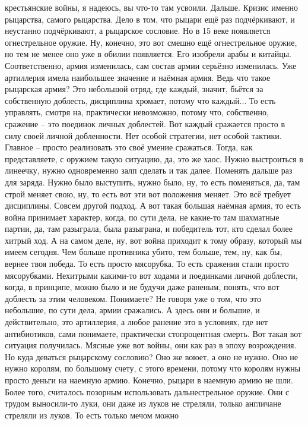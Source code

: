 крестьянские войны, я надеюсь, вы что-то там усвоили. Дальше. Кризис именно
рыцарства, самого рыцарства. Дело в том, что рыцари ещё раз подчёркивают, и
неустанно подчёркивают, а рыцарское сословие. Но в 15 веке появляется
огнестрельное оружие. Ну, конечно, это вот смешно ещё огнестрельное оружие, но
тем не менее оно уже в обилии появляется. Его изобрели арабы и китайцы.
Соответственно, армия изменилась, сам состав армии серьёзно изменилась. Уже
артиллерия имела наибольшее значение и наёмная армия. Ведь что такое рыцарская
армия? Это небольшой отряд, где каждый, значит, бьётся за собственную доблесть,
дисциплина хромает, потому что каждый... То есть управлять, смотря на,
практически невозможно, потому что, собственно, сражение – это поединок личных
доблестей. Вот каждый сражается просто в силу своей личной добленности. Нет
особой стратегии, нет особой тактики. Главное – просто реализовать это своё
умение сражаться. Тогда, как представляете, с оружием такую ситуацию, да, это же
хаос. Нужно выстроиться в линеечку, нужно одновременно залп сделать и так далее.
Поменять дальше раз для заряда. Нужно было выступить, нужно было, ну, то есть
поменяться, да, там строй меняет свою, ну, то есть вот эти вот положения меняет.
Это всё требует дисциплины. Совсем другой подход. А вот такая большая наёмная
армия, то есть война принимает характер, когда, по сути дела, не какие-то там
шахматные партии, да, там разыграла, была разыграна, и победитель тот, кто
сделал более хитрый ход. А на самом деле, ну, вот война приходит к тому образу,
который мы имеем сегодня. Чем больше противника убито, тем больше, тем, ну, как
бы, вернее твоя победа. То есть просто мясорубка. То есть сражения стали просто
мясорубками. Нехитрыми какими-то вот ходами и поединками личной доблести, когда,
в принципе, можно было и не будучи даже раненым, понять, что вот доблесть за
этим человеком. Понимаете? Не говоря уже о том, что это небольшие, по сути дела,
армии сражались. А здесь они и большие, и действительно, это артиллерия, а любое
ранение это в условиях, где нет антибиотиков, сами понимаете, практически
стопроцентная смерть. Вот такая вот ситуация получилась. Мясные уже вот войны,
они как раз в эпоху возрождения. Но куда деваться рыцарскому сословию? Оно же
воюет, а оно не нужно. Оно не нужно королям, по большому счету, с этого времени,
потому что королям нужны просто деньги на наемную армию. Конечно, рыцари в
наемную армию не шли. Более того, считалось позорным использовать
дальнестрельное оружие. Они с трудом выносили-то луки, они даже из луков не
стреляли, только англичане стреляли из луков. То есть только мечом можно
